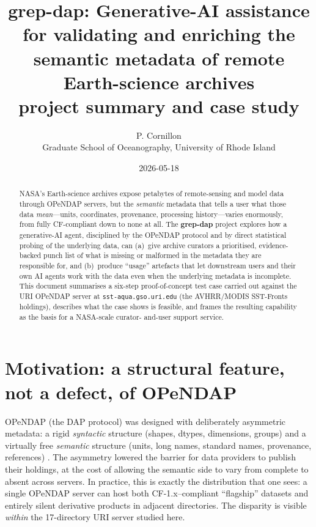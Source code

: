 \documentclass[11pt]{article}
\title{\textbf{grep-dap}: Generative-AI assistance for validating and
       enriching the semantic metadata of remote Earth-science
       archives\\
       \large project summary and case study}
\author{P. Cornillon\\
\small Graduate School of Oceanography, University of Rhode Island}
\date{2026-05-18}
\begin{document}
\maketitle

\begin{abstract}
NASA's Earth-science archives expose petabytes of remote-sensing
and model data through OPeNDAP servers, but the \emph{semantic}
metadata that tells a user what those data \emph{mean}---units,
coordinates, provenance, processing history---varies enormously,
from fully CF-compliant down to none at all. The
\textbf{grep-dap} project explores how a generative-AI agent,
disciplined by the OPeNDAP protocol and by direct statistical
probing of the underlying data, can (a)~give archive curators a
prioritised, evidence-backed punch list of what is missing or
malformed in the metadata they are responsible for, and
(b)~produce ``usage'' artefacts that let downstream users and
their own AI agents work with the data even when the underlying
metadata is incomplete. This document summarises a six-step
proof-of-concept test case carried out against the URI OPeNDAP
server at \texttt{sst-aqua.gso.uri.edu} (the AVHRR/MODIS SST-Fronts
holdings), describes what the case shows is feasible, and frames
the resulting capability as the basis for a NASA-scale curator-
and-user support service.
\end{abstract}

\section{Motivation: a structural feature, not a defect, of OPeNDAP}

OPeNDAP (the DAP protocol) was designed with deliberately
asymmetric metadata: a rigid \emph{syntactic} structure (shapes,
dtypes, dimensions, groups) and a virtually free \emph{semantic}
structure (units, long names, standard names, provenance,
references) \cite{dap4}. The asymmetry lowered the barrier for
data providers to publish their holdings, at the cost of allowing
the semantic side to vary from complete to absent across servers.
In practice, this is exactly the distribution that one sees: a
single OPeNDAP server can host both CF-1.x--compliant ``flagship''
datasets and entirely silent derivative products in adjacent
directories. The disparity is visible \emph{within} the
17-directory URI server studied here.
\end{document}
